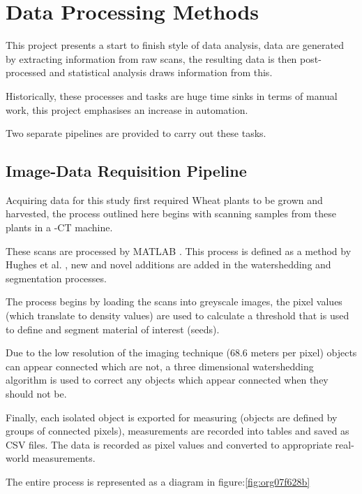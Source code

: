 \documentclass[11pt]{report}
\begin{document}
\section{Data Processing Methods}
\label{sec:org532989e}
This project presents a start to finish style of data analysis, data are generated by extracting information from raw scans, the resulting data is then post-processed and statistical analysis draws information from this.

Historically, these processes and tasks are huge time sinks in terms of manual work, this project emphasises an increase in automation.

Two separate pipelines are provided to carry out these tasks.

\subsection{Image-Data Requisition Pipeline}
\label{sec:org9f63e2e}

Acquiring data for this study first required Wheat plants to be grown and harvested, the process outlined here begins with scanning samples from these plants in a \textmu{}-CT machine.

These scans are processed by MATLAB \cite{MATHWORKS2017}. This process is defined as a method by Hughes et al. \cite{Hughes2017}, new and novel additions are added in the watershedding and segmentation processes.

The process begins by loading the scans into greyscale images, the pixel values (which translate to density values) are used to calculate a threshold that is used to define and segment material of interest (seeds).

Due to the low resolution of the imaging technique (68.6\textmu{} meters per pixel) objects can appear connected which are not, a three dimensional watershedding algorithm is used to correct any objects which appear connected when they should not be.

Finally, each isolated object is exported for measuring (objects are defined by groups of connected pixels), measurements are recorded into tables and saved as CSV files. The data is recorded as pixel values and converted to appropriate real-world measurements.

The entire process is represented as a diagram in figure:\ref{fig:org07f628b}
\end{document}
